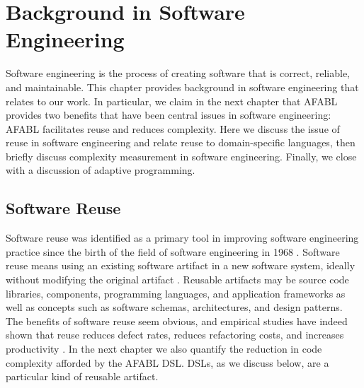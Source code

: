 \chapter{Background in Software Engineering}\label{ch:se}

Software engineering is the process of creating software that is correct, reliable, and maintainable. This chapter provides background in software engineering that relates to our work. In particular, we claim in the next chapter that AFABL provides two benefits that have been central issues in software engineering: AFABL facilitates reuse and reduces complexity. Here we discuss the issue of reuse in software engineering and relate reuse to domain-specific languages, then briefly discuss complexity measurement in software engineering. Finally, we close with a discussion of adaptive programming.

\section{Software Reuse}

Software reuse was identified as a primary tool in improving software engineering practice since the birth of the field of software engineering in 1968 \cite{mcilroy1968mass}. Software reuse means using an existing software artifact in a new software system, ideally without modifying the original artifact \cite{krueger1992a-software,frakes2005a-software}. Reusable artifacts may be source code libraries, components, programming languages, and application frameworks \cite{polancic2010a-an-empirical} as well as concepts such as software schemas, architectures, and design patterns. The benefits of software reuse seem obvious, and empirical studies have indeed shown that reuse reduces defect rates, reduces refactoring costs, and increases productivity \cite{basili1996a-how-reuse,mohagheghi2008a-an-empirical}. In the next chapter we also quantify the reduction in code complexity afforded by the AFABL DSL. DSLs, as we discuss below, are a particular kind of reusable artifact.

